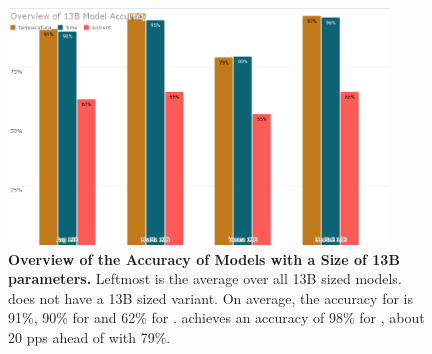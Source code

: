 \begin{figure}[!htbp]
    \begin{centering}
        \includegraphics[width=0.9\textwidth]{img/overview_13b_accuracy}
        \caption[Overview of 13B Models Accuracy]{\textbf{Overview of the Accuracy of Models with a Size of 13B parameters.}
        Leftmost is the average over all 13B sized models.
         does not have a 13B sized variant.
        On average, the accuracy for \ttemp is 91\%, 90\% for \ttime and 62\% for \tsolv.
         achieves an accuracy of 98\% for \ttemp, about 20 \glspl{pp} ahead of  with 79\%.
        }
        \label{fig:13b_acc}
    \end{centering}
\end{figure}

